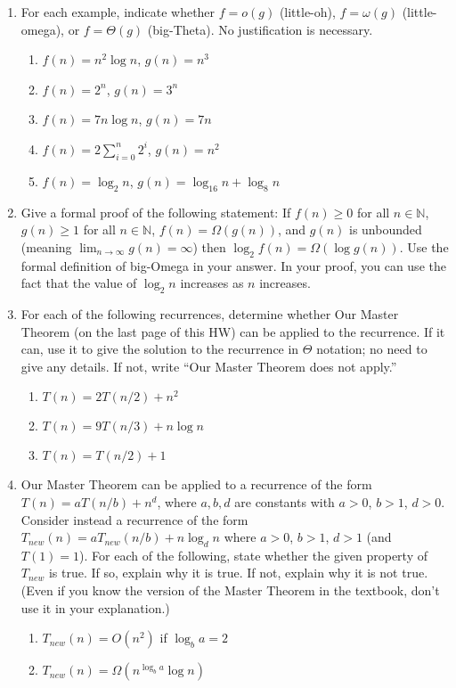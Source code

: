 \documentclass{article}
\begin{document}
\begin{enumerate}
    \item For each example, indicate whether $f = o(g)$ (little-oh), $f = \omega(g)$ (little-omega), or $f = \Theta(g)$ (big-Theta). No justification is necessary.
    \begin{enumerate}
        \item $f(n) = n^2 \log n$, $g(n) = n^3$
        \item $f(n) = 2^n$, $g(n) = 3^n$
        \item $f(n) = 7n \log n$, $g(n) = 7n$
        \item $f(n) = 2 \sum_{i=0}^n 2^i$, $g(n) = n^2$
        \item $f(n) = \log_2 n$, $g(n) = \log_{16} n + \log_8 n$
    \end{enumerate}

    \item Give a formal proof of the following statement: If $f(n) \ge 0$ for all $n \in \mathbb{N}$, $g(n) \ge 1$ for all $n \in \mathbb{N}$, $f(n) = \Omega(g(n))$, and $g(n)$ is unbounded (meaning $\lim_{n \to \infty} g(n) = \infty$) then $\log_2 f(n) = \Omega(\log g(n))$. Use the formal definition of big-Omega in your answer. In your proof, you can use the fact that the value of $\log_2 n$ increases as $n$ increases.

    \item For each of the following recurrences, determine whether Our Master Theorem (on the last page of this HW) can be applied to the recurrence. If it can, use it to give the solution to the recurrence in $\Theta$ notation; no need to give any details. If not, write “Our Master Theorem does not apply.”
    \begin{enumerate}
        \item $T(n) = 2T(n/2) + n^2$
        \item $T(n) = 9T(n/3) + n \log n$
        \item $T(n) = T(n/2) + 1$
    \end{enumerate}

    \item Our Master Theorem can be applied to a recurrence of the form $T(n) = aT(n/b) + n^d$, where $a, b, d$ are constants with $a > 0$, $b > 1$, $d > 0$. Consider instead a recurrence of the form $T_{new}(n) = aT_{new}(n/b) + n \log_d n$ where $a > 0$, $b > 1$, $d > 1$ (and $T(1) = 1$). For each of the following, state whether the given property of $T_{new}$ is true. If so, explain why it is true. If not, explain why it is not true. (Even if you know the version of the Master Theorem in the textbook, don’t use it in your explanation.)
    \begin{enumerate}
        \item $T_{new}(n) = O(n^2)$ if $\log_b a = 2$
        \item $T_{new}(n) = \Omega(n^{\log_b a} \log n)$
    \end{enumerate}


\end{enumerate}
\end{document}

